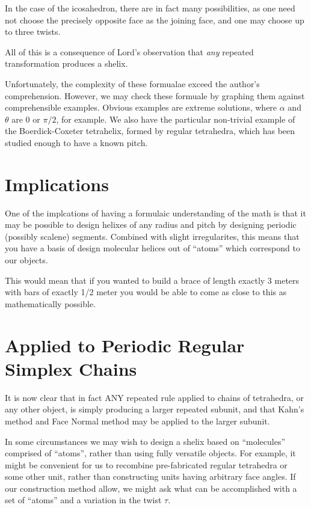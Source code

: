 \documentclass[11pt]{article}
\begin{document}
{In the case of the icosahedron, there are in fact many possibilities,
as one need not choose the precisely opposite face as the joining face, and
one may choose up to three twists.

All of this is a consequence of Lord's observation that {\em any}
repeated transformation produces a shelix.

Unfortunately, the complexity of these formualae exceed the author's comprehension.
However, we may check these formuale by graphing them against comprehensible
examples. Obvious examples are extreme solutions, where $\alpha$  and $\theta$ are
$0$ or $\pi/2$, for example. We also have the particular non-trivial example
of the Boerdick-Coxeter tetrahelix, formed by regular tetrahedra, which has
been studied enough to have a known pitch.

\section{Implications}

One of the implcations of having a formulaic understanding of the math
is that it may be possible to design helixes
of any radius and pitch by designing periodic (possibly scalene) segments. Combined with slight
irregularites, this means that you have a basis of design molecular helices
out of ``atoms'' which correspond to our objects.

This would mean that if you wanted to build a brace of length exactly 3 meters
with bars of exactly 1/2 meter you would be able to come as close to this
as mathematically possible.


\section{Applied to Periodic Regular Simplex Chains}

It is now clear that in fact ANY repeated rule applied to chains of tetrahedra, or any other object,
is simply producing a larger repeated subunit, and that Kahn's method and Face Normal method
may be applied to the larger subunit.

In some circumstances we may wish to design a shelix based on ``molecules'' comprised of ``atoms'',
rather than using fully versatile objects. For example, it might be convenient for us to
recombine pre-fabricated regular tetrahedra or some other unit, rather than constructing
units having arbitrary face angles. If our construction method allow, we might ask
what can be accomplished with a set of ``atoms'' and a variation in the twist $\tau$\cite{elgersma2016quadrahelix}.

}
\end{document}
